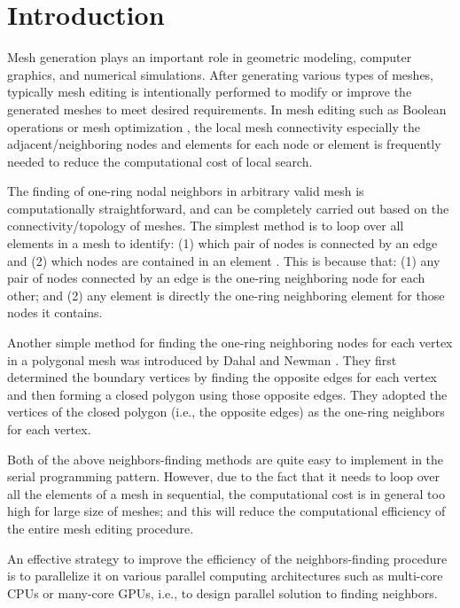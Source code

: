 \documentclass[twocolumn]{svjour3}          \smartqed  \usepackage{graphicx}
\begin{document}
\section{Introduction}
\label{sec:introduction}
Mesh generation plays an important role in geometric modeling, computer graphics, and numerical simulations. After generating various types of 
meshes, typically mesh editing is intentionally performed to modify or 
improve the generated meshes to meet desired requirements. In mesh editing 
such as Boolean operations \cite{01_Feito2013705} or mesh optimization \cite{02_DAmato20131127}, the local mesh connectivity especially the adjacent/neighboring nodes and elements for each node or element is frequently needed 
to reduce the computational cost of local search. 

The finding of one-ring nodal neighbors in arbitrary valid mesh is 
computationally straightforward, and can be completely carried out based on 
the connectivity/topology of meshes. The simplest method is to loop over 
all elements in a mesh to identify: (1) which pair of nodes is connected by 
an edge and (2) which nodes are contained in an element \cite{02_DAmato20131127,03_Mei2014,04_Chen2014}. This is 
because that: (1) any pair of nodes connected by an edge is the one-ring 
neighboring node for each other; and (2) any element is directly the 
one-ring neighboring element for those nodes it contains. 

Another simple method for finding the one-ring neighboring nodes for each 
vertex in a polygonal mesh was introduced by Dahal and Newman \cite{05_6950720}. 
They first determined the boundary vertices by finding the opposite edges 
for each vertex and then forming a closed polygon using those opposite 
edges. They adopted the vertices of the closed polygon (i.e., the opposite 
edges) as the one-ring neighbors for each vertex. 

Both of the above neighbors-finding methods are quite easy to implement in 
the serial programming pattern. However, due to the fact that it needs to 
loop over all the elements of a mesh in sequential, the computational cost 
is in general too high for large size of meshes; and this will reduce the 
computational efficiency of the entire mesh editing procedure. 

An effective strategy to improve the efficiency of the neighbors-finding 
procedure is to parallelize it on various parallel computing architectures 
such as multi-core CPUs or many-core GPUs, i.e., to design parallel solution 
to finding neighbors. 
\end{document}
